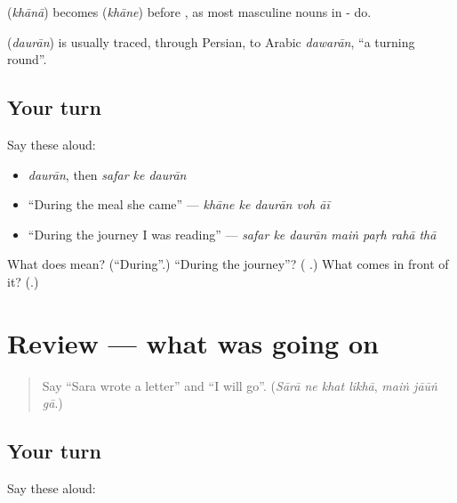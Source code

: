 \textbf{} (\emph{khānā}) becomes \textbf{} (\emph{khāne}) before \textbf{}, as most masculine nouns in - do.

\begin{cousinweb}
\textbf{} (\emph{daurān}) is usually traced, through Persian, to Arabic \emph{dawarān}, \textquotedblleft{}a turning round\textquotedblright{}.
\end{cousinweb}

\subsection*{Your turn}
Say these aloud:

\begin{itemize}
\raggedright
  \item \emph{daurān}, then \emph{safar ke daurān}
  \item \textquotedblleft{}During the meal she came\textquotedblright{} — \emph{khāne ke daurān voh āī}
  \item \textquotedblleft{}During the journey I was reading\textquotedblright{} — \emph{safar ke daurān maiṅ paṛh rahā thā}
\end{itemize}

\begin{tcolorbox}[breakable,colback=teal!4,colframe=teal!35!black,title={Before you move on}]
What does \textbf{} mean? (\textquotedblleft{}During\textquotedblright{}.) \textquotedblleft{}During the journey\textquotedblright{}? (\textbf{  }.) What comes in front of it? (\textbf{}.)
\end{tcolorbox}
\section[(review)]{Review — what was going on}

\label{lesson:UR-R266-what-was-going-on}



\begin{quote}
Say \textquotedblleft{}Sara wrote a letter\textquotedblright{} and \textquotedblleft{}I will go\textquotedblright{}. (\emph{Sārā ne khat likhā}, \emph{maiṅ jāūṅ gā}.)
\end{quote}

\subsection*{Your turn}
Say these aloud:

